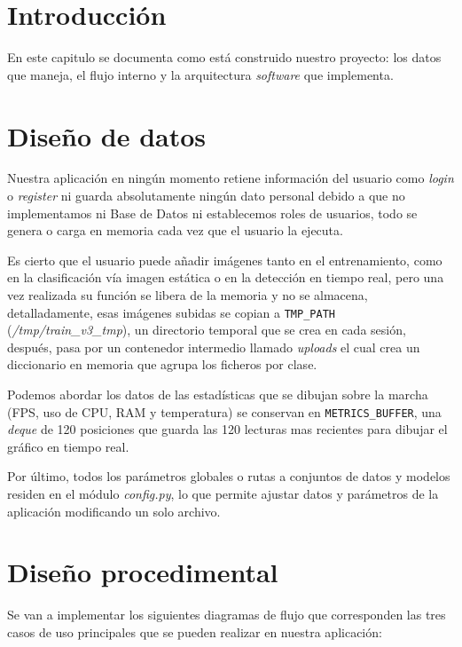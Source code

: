 
\section{Introducción}
En este capitulo se documenta como está construido nuestro proyecto: los datos que maneja, el flujo interno y la arquitectura \textit{software} que implementa.

\section{Diseño de datos}
Nuestra aplicación en ningún momento retiene información del usuario como \textit{login} o \textit{register} ni guarda absolutamente ningún dato personal debido a que no implementamos ni Base de Datos ni establecemos roles de usuarios, todo se genera o carga en memoria cada vez que el usuario la ejecuta.

Es cierto que el usuario puede añadir imágenes tanto en el entrenamiento, como en la clasificación vía imagen estática o en la detección en tiempo real, pero una vez realizada su función se libera de la memoria y no se almacena, detalladamente, esas imágenes subidas se copian a \texttt{TMP\_PATH} (\textit{/tmp/train\_v3\_tmp}), un directorio temporal que se crea en cada sesión, después, pasa por un contenedor intermedio llamado \textit{uploads} el cual crea un diccionario en memoria que agrupa los ficheros por clase.

Podemos abordar los datos de las estadísticas que se dibujan sobre la marcha (FPS, uso de CPU, RAM y temperatura) se conservan en \texttt{METRICS\_BUFFER}, una \textit{deque} de 120 posiciones que guarda las 120 lecturas mas recientes para dibujar el gráfico en tiempo real.

Por último, todos los parámetros globales o rutas a conjuntos de datos y modelos residen en el módulo \textit{config.py}, lo que permite ajustar datos y parámetros de la aplicación modificando un solo archivo.



\section{Diseño procedimental}
Se van a implementar los siguientes diagramas de flujo que corresponden las tres casos de uso principales que se pueden realizar en nuestra aplicación:



